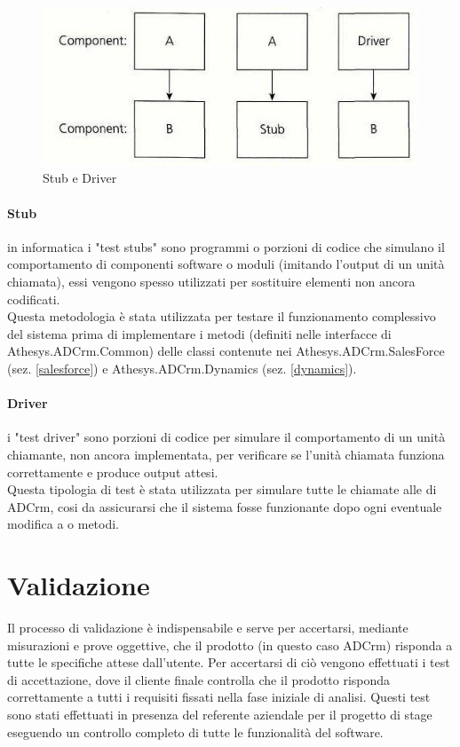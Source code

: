 \documentclass[12pt,a4paper,twoside,openany,english]{book}
\begin{document}
\begin{figure}[H]
	\centering
	\includegraphics[width=\linewidth]{images/stubDriver}
	\caption{Stub e Driver}
	\label{fig:stubdriver}
\end{figure}

\paragraph{Stub} 
in informatica i "test stubs" sono programmi o porzioni di codice che simulano il comportamento di componenti software o moduli (imitando l'output di un unità chiamata), essi vengono spesso utilizzati per sostituire elementi non ancora codificati.\\
Questa metodologia è stata utilizzata per testare il funzionamento complessivo del sistema prima di implementare i metodi (definiti nelle interfacce di Athesys.ADCrm.Common) delle classi contenute nei  Athesys.ADCrm.SalesForce (sez. \ref{salesforce}) e Athesys.ADCrm.Dynamics (sez. \ref{dynamics}).

\paragraph{Driver} 
i "test driver" sono porzioni di codice per simulare il comportamento di un unità chiamante, non ancora implementata, per verificare se l'unità chiamata funziona correttamente e produce output attesi.\\
Questa tipologia di test è stata utilizzata per simulare tutte le chiamate alle  di ADCrm, cosi da assicurarsi che il sistema fosse funzionante dopo ogni eventuale modifica a  o metodi.
\section{Validazione}
Il processo di validazione è indispensabile e serve per accertarsi, mediante misurazioni e prove oggettive, che il prodotto (in questo caso ADCrm) risponda a tutte le specifiche attese dall'utente.
Per accertarsi di ciò vengono effettuati i test di accettazione, dove il cliente finale controlla che il prodotto risponda correttamente a tutti i requisiti fissati nella fase iniziale di analisi.
Questi test sono stati effettuati in presenza del referente aziendale per il progetto di stage eseguendo un controllo completo di tutte le funzionalità del software.
\end{document}
